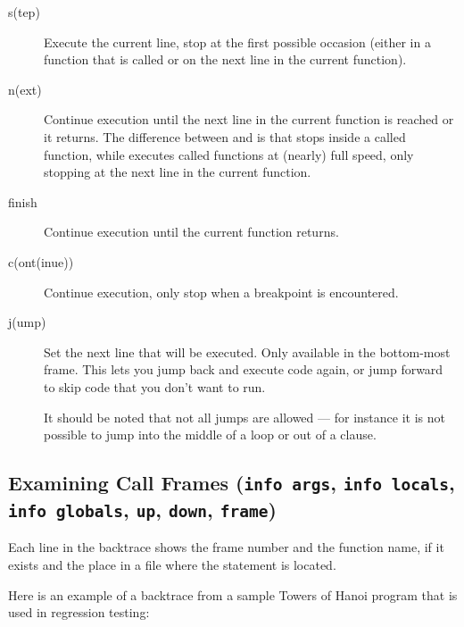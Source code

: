 \begin{description}

\item[s(tep) ]

Execute the current line, stop at the first possible occasion
(either in a function that is called or on the next line in the
current function).

\item[n(ext) ]

Continue execution until the next line in the current function
is reached or it returns.  The difference between  and
 is that  stops inside a called function, while
 executes called functions at (nearly) full speed, only
stopping at the next line in the current function.

\item[finish]

Continue execution until the current function returns.

\item[c(ont(inue))]

Continue execution, only stop when a breakpoint is encountered.

\item[j(ump) ]

Set the next line that will be executed.  Only available in the
bottom-most frame.  This lets you jump back and execute code
again, or jump forward to skip code that you don't want to run.

It should be noted that not all jumps are allowed --- for instance it
is not possible to jump into the middle of a  loop or out
of a  clause.

\end{description}

\subsection{Examining Call Frames ({\tt info args}, {\tt info
    locals}, {\tt info globals}, {\tt up}, {\tt down}, {\tt frame})\label{subsection:frames}}

Each line in the backtrace shows the frame number and the function
name, if it exists and the place in a file where the statement is
located.

Here is an example of a backtrace from a sample Towers of Hanoi
program that is used in regression testing:

